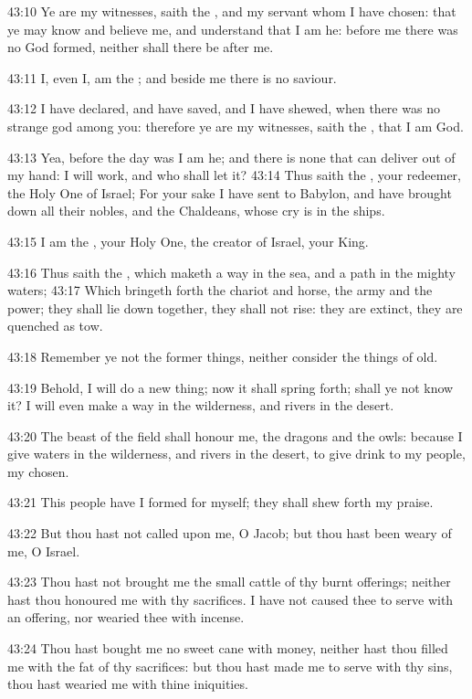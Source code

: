 43:10 Ye are my witnesses, saith the \LORD, and my servant whom I have chosen: that ye may know and believe me, and understand that I am he: before me there was no God formed, neither shall there be after me.

43:11 I, even I, am the \LORD; and beside me there is no saviour.

43:12 I have declared, and have saved, and I have shewed, when there was no strange god among you: therefore ye are my witnesses, saith the \LORD, that I am God.

43:13 Yea, before the day was I am he; and there is none that can deliver out of my hand: I will work, and who shall let it?  43:14 Thus saith the \LORD, your redeemer, the Holy One of Israel; For your sake I have sent to Babylon, and have brought down all their nobles, and the Chaldeans, whose cry is in the ships.

43:15 I am the \LORD, your Holy One, the creator of Israel, your King.

43:16 Thus saith the \LORD, which maketh a way in the sea, and a path in the mighty waters; 43:17 Which bringeth forth the chariot and horse, the army and the power; they shall lie down together, they shall not rise: they are extinct, they are quenched as tow.

43:18 Remember ye not the former things, neither consider the things of old.

43:19 Behold, I will do a new thing; now it shall spring forth; shall ye not know it? I will even make a way in the wilderness, and rivers in the desert.

43:20 The beast of the field shall honour me, the dragons and the owls: because I give waters in the wilderness, and rivers in the desert, to give drink to my people, my chosen.

43:21 This people have I formed for myself; they shall shew forth my praise.

43:22 But thou hast not called upon me, O Jacob; but thou hast been weary of me, O Israel.

43:23 Thou hast not brought me the small cattle of thy burnt offerings; neither hast thou honoured me with thy sacrifices. I have not caused thee to serve with an offering, nor wearied thee with incense.

43:24 Thou hast bought me no sweet cane with money, neither hast thou filled me with the fat of thy sacrifices: but thou hast made me to serve with thy sins, thou hast wearied me with thine iniquities.

